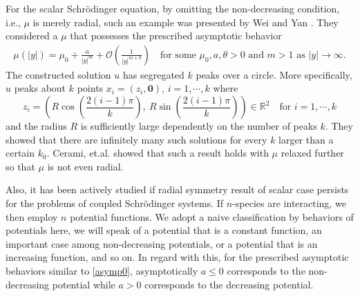 \documentclass[a4paper,11pt]{article}
\theoremstyle{remark}
\begin{document}
For the scalar Schr\"odinger equation, by omitting the non-decreasing condition, i.e., $\mu$ is merely radial, such an example was presented by Wei and Yan \cite{wei_yan_2014}. They considered a $\mu$ that possesses the prescribed asymptotic behavior
\begin{align} \label{asymp0}
 \mu(|y|) = \mu_0 + \frac{a}{|y|^m} + \mathcal{O}\left(\frac{1}{|y|^{m+\theta}}\right) \quad \text{for some $\mu_0,a,\theta>0$ and $m>1$ as $|y| \rightarrow \infty$}.
\end{align}
The constructed solution $u$ has segregated $k$ peaks over a circle. More specifically, $u$ peaks about $k$ points $x_i=(z_i,\mathbf{0})$, $i=1,\cdots,k$ where
$$z_i= \left( R \cos\left(\frac{2(i-1)\pi}{k}\right), ~R \sin\left(\frac{2(i-1)\pi}{k}\right)\right)\in \mathbb{R}^2 \quad \text{for $i=1,\cdots,k$}$$
and the radius $R$ is sufficiently large dependently on the number of peaks $k$. They showed that there are infinitely many such solutions for every $k$ larger than a certain $k_0$. Cerami, et.al. \cite{cerami_passaseo_solimini_2015} showed that such a result holds with $\mu$ relaxed further so that $\mu$ is not even radial. 

Also, it has been actively studied if radial symmetry result of scalar case persists for the problems of coupled Schr\"odinger systems. If $n$-species are interacting, we then employ $n$ potential functions. We adopt a naive classification by behaviors of potentials here, we will speak of a potential that is a constant function, an important case among non-decreasing potentials, or a potential that is an increasing function, and so on. In regard with this, for the prescribed asymptotic behaviors similar to \eqref{asymp0},  asymptotically $a\le 0$ corresponds to the non-decreasing potential while $a>0$ corresponds to the decreasing potential.
\end{document}
